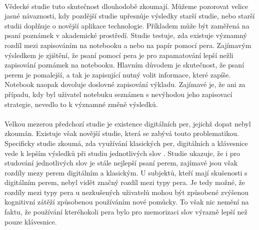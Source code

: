 \documentclass[journal]{IEEEtran}
\begin{document}
\paragraph{}
Vědecké studie tuto skutečnost dlouhodobě zkoumají.
Můžeme pozorovat velice jasné návaznosti, kdy pozdější studie upřesnůje výsledky starší studie, nebo starší studii doplňuje o novější aplikace technologie.
Příkladem může být zaměřená na psaní poznámek v akademické prostředí\cite{mightier_pen}. Studie testuje, zda existuje významný rozdíl mezi zapisováním na notebooku a nebo na papír pomocí pera.
Zajímavým výsledkem je zjištění, že psaní pomocí pera je pro zapamatování lepší nežli zapisování poznámek na notebooku.
Hlavním důvodem je skutečnost, že psaní perem je pomalejší, a tak je zapisující nutný volit informace, které zapíše.
Notebook naopak dovoluje doslovné zapisování výkladu.
Zajímavé je, že ani za případu, kdy byl uživatel notebuku seznámen s nevýhodou jeho zapisovací strategie, nevedlo to k významné změně výsledků.

\paragraph{}
Velkou mezerou předchozí studie je existence digitálních per, jejichž dopat nebyl zkoumán.
Existuje však novější studie, která se zabývá touto problematikou.
Specificky studie zkoumá, zda využívání klasických per, digitálních a klávesnice vede k lepším výsledků při studiu jednotlivých slov
\cite{advantage_of_handwriting}.
Studie ukazuje, že i pro studování jednotlivých slov je stále nejlepší psaní perem, zajímavé jsou však rozdíly mezy perem digitálním a klasickým.
U subjektů, kteří mají skušenosti s digitálním perem, nebyl vidět značný rozdíl mezi typy pera.
Je tedy možné, že rozdíly mezi typy pera u nezkušených uživatelů mohou být způsobené zvýšenou kognitivní zátěží způsobenou používáním nové pomůcky. To však nic nemění na faktu, že používání kteréhokoli pera bylo pro memorizaci slov výrazně lepší než pouze klávesnice.
\end{document}
